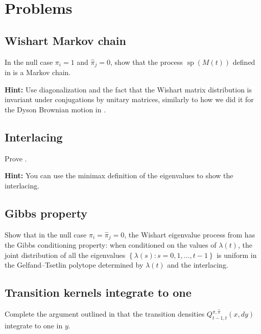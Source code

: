 \documentclass[letterpaper,11pt,oneside,reqno]{book}
\numberwithin{equation}{chapter}  %
\theoremstyle{definition}
\begin{document}
\section{Problems}

\subsection{Wishart Markov chain}
\label{lecture13:prob:Markov}

In the null case $\pi_i = 1$ and $\hat\pi_j = 0$,
show that the
process $\operatorname{sp}(M(t))$
defined in 
is a Markov chain.

\medskip
\noindent
\textbf{Hint:} Use diagonalization and
the fact that the Wishart matrix distribution is invariant under
conjugations by unitary matrices,
similarly to how we did it for the Dyson Brownian motion in
.


\subsection{Interlacing}
\label{lecture13:prob:interlacing}

Prove .

\medskip
\noindent
\textbf{Hint:} You can use the minimax definition of the eigenvalues to show the interlacing.

\subsection{Gibbs property}
\label{lecture13:prob:Gibbs}

Show that in the null case \(\pi_i = \hat\pi_j = 0\), the
Wishart eigenvalue process
from 
has the Gibbs conditioning property:
when conditioned on the values of
$\lambda(t)$, the joint distribution of
all the eigenvalues
$\left\{ \lambda(s)\colon s=0,1,\ldots,t-1  \right\}$
is uniform in the Gelfand--Tsetlin polytope
determined by $\lambda(t)$ and the interlacing.


\subsection{Transition kernels integrate to one}
\label{lecture13:prob:CauchyBinet}

Complete the argument outlined in 
that the transition densities $Q^{\pi,\hat\pi}_{t-1,t}(x,dy)$
integrate to one in $y$.
\end{document}

